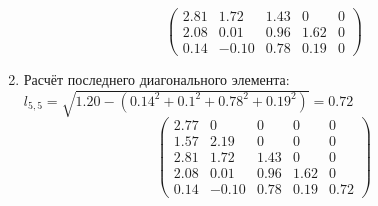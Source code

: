 \begin{multicols}{3}
\begin{enumerate}
$$\begin{pmatrix}
        2.81 & 1.72  & 1.43 & 0    & 0 \\
        2.08 & 0.01  & 0.96 & 1.62 & 0 \\
        0.14 & -0.10 & 0.78 & 0.19 & 0
    \end{pmatrix}$$
    \vspace{-0.5cm}
    \item Расчёт последнего диагонального элемента: $l_{5,5} = \sqrt{1.20 - (0.14^2+0.1^2+0.78^2+0.19^2)} = 0.72$
    $$\begin{pmatrix}
        2.77 & 0     & 0    & 0    & 0    \\
        1.57 & 2.19  & 0    & 0    & 0    \\
        2.81 & 1.72  & 1.43 & 0    & 0    \\
        2.08 & 0.01  & 0.96 & 1.62 & 0    \\
        0.14 & -0.10 & 0.78 & 0.19 & 0.72
    \end{pmatrix}$$
    \end{enumerate}



\end{multicols}
